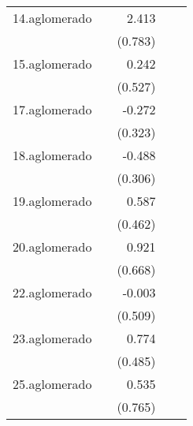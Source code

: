 {\begin{longtable}{l*{4}{D{.}{.}{-1}}}
\addlinespace
14.aglomerado&                     &       2.413\sym{**} &                     &                     \\
            &                     &     (0.783)         &                     &                     \\
\addlinespace
15.aglomerado&                     &       0.242         &                     &                     \\
            &                     &     (0.527)         &                     &                     \\
\addlinespace
17.aglomerado&                     &      -0.272         &                     &                     \\
            &                     &     (0.323)         &                     &                     \\
\addlinespace
18.aglomerado&                     &      -0.488         &                     &                     \\
            &                     &     (0.306)         &                     &                     \\
\addlinespace
19.aglomerado&                     &       0.587         &                     &                     \\
            &                     &     (0.462)         &                     &                     \\
\addlinespace
20.aglomerado&                     &       0.921         &                     &                     \\
            &                     &     (0.668)         &                     &                     \\
\addlinespace
22.aglomerado&                     &      -0.003         &                     &                     \\
            &                     &     (0.509)         &                     &                     \\
\addlinespace
23.aglomerado&                     &       0.774         &                     &                     \\
            &                     &     (0.485)         &                     &                     \\
\addlinespace
25.aglomerado&                     &       0.535         &                     &                     \\
            &                     &     (0.765)         &                     &                     \\

\end{longtable}}
